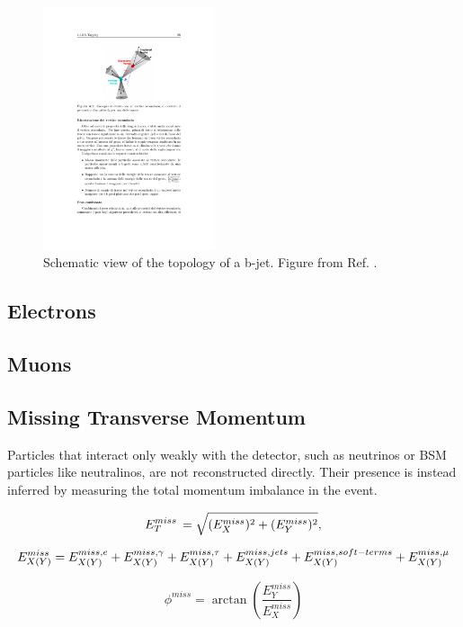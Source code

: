 \begin{figure}[h]
\begin{center}
\includegraphics[width=0.45\textwidth]{./figures/objects/secvtx.pdf}
\end{center}
\caption[Schematic view of the topology of a b-jet.]{Schematic view of the topology of a b-jet. Figure from Ref. \cite{dobtagging}.}
\label{fig:btag}
\end{figure}

\subsection{Electrons}

\subsection{Muons}

\subsection{Missing Transverse Momentum}

Particles that interact only weakly with the detector, such as neutrinos or BSM particles like neutralinos, are not reconstructed directly. 
Their presence is instead inferred by measuring the total momentum imbalance in the event. 

\begin{equation}
E_{T}^{miss}\, = \sqrt{(E_{X}^{miss})^{2}  +  (E_{Y}^{miss})^{2}},
\end{equation}

\begin{equation}
E_{X(Y)}^{miss} = E_{X(Y)}^{miss,e} +    E_{X(Y)}^{miss,\gamma} + E_{X(Y)}^{miss,\tau}    \nonumber \\
+ E_{X(Y)}^{miss,jets} + E_{X(Y)}^{miss,soft-terms}  +  E_{X(Y)}^{miss,\mu} 
\label{eq:etm} 
\end{equation}


\begin{equation}
\phi^{miss} = \arctan \left( \frac{E_Y^{miss}}{E_X^{miss}} \right)
\end{equation}




